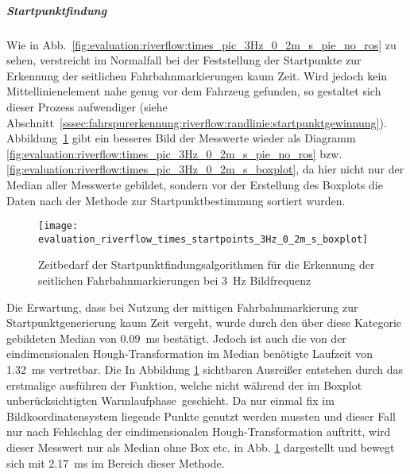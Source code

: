 \subparagraph{Startpunktfindung}
Wie in Abb.~\ref{fig:evaluation:riverflow:times_pic_3Hz_0_2m_s_pie_no_ros} zu sehen, verstreicht im Normalfall bei der Feststellung der Startpunkte zur Erkennung der seitlichen Fahrbahnmarkierungen kaum Zeit. Wird jedoch kein Mittellinienelement nahe genug vor dem Fahrzeug gefunden, so gestaltet sich dieser Prozess aufwendiger (siehe Abschnitt~\ref{sssec:fahrspurerkennung:riverflow:randlinie:startpunktgewinnung}). Abbildung~\ref{fig:evaluation:riverflow:times_startpoints_3Hz_0_2m_s_boxplot} gibt ein besseres Bild der Messwerte wieder als Diagramm \ref{fig:evaluation:riverflow:times_pic_3Hz_0_2m_s_pie_no_ros} bzw. \ref{fig:evaluation:riverflow:times_pic_3Hz_0_2m_s_boxplot}, da hier nicht nur der Median aller Messwerte gebildet, sondern vor der Erstellung des Boxplots die Daten nach der Methode zur Startpunktbestimmung sortiert wurden. 
\begin{figure}[htbp] %
	\centering
	\texttt{[image: evaluation\_riverflow\_times\_startpoints\_3Hz\_0\_2m\_s\_boxplot]}
	\caption{Zeitbedarf der Startpunktfindungsalgorithmen für die Erkennung der seitlichen Fahrbahnmarkierungen bei \SI{3}{\hertz} Bildfrequenz}
	\label{fig:evaluation:riverflow:times_startpoints_3Hz_0_2m_s_boxplot}
\end{figure}
Die Erwartung, dass bei Nutzung der mittigen Fahrbahnmarkierung zur Startpunktgenerierung kaum Zeit vergeht, wurde durch den über diese Kategorie gebildeten Median von \SI{0,09}{ms} bestätigt. Jedoch ist auch die von der eindimensionalen Hough-Transformation im Median benötigte Laufzeit von \SI{1,32}{ms} vertretbar. Die In Abbildung \ref{fig:evaluation:riverflow:times_startpoints_3Hz_0_2m_s_boxplot} sichtbaren Ausreißer entstehen durch das erstmalige ausführen der Funktion, welche nicht während der im Boxplot unberücksichtigten \glqq Warmlaufphase\grqq\ geschieht. Da nur einmal fix im Bildkoordinatensystem liegende Punkte genutzt werden mussten und dieser Fall nur nach Fehlschlag der eindimensionalen Hough-Transformation auftritt, wird dieser Messwert nur als Median ohne Box etc. in Abb. \ref{fig:evaluation:riverflow:times_startpoints_3Hz_0_2m_s_boxplot} dargestellt und bewegt sich mit \SI{2,17}{ms} im Bereich dieser Methode.

